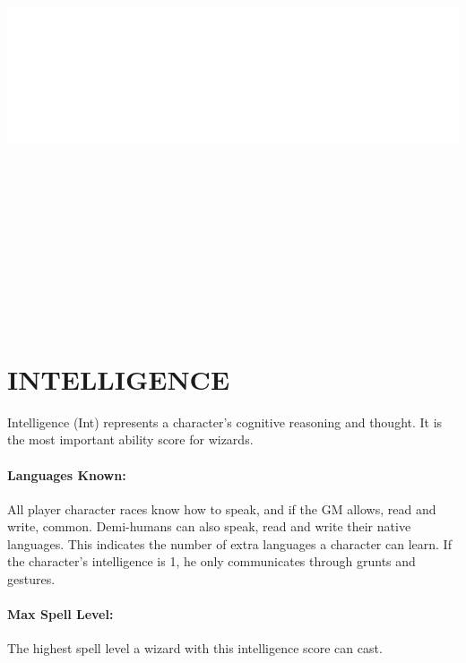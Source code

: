 \begin{multicols}{2}

\noindent\includegraphics[width=\columnwidth, height=5.75in]{testblock.pdf}  

\section{INTELLIGENCE}

Intelligence (Int) represents a character's cognitive reasoning and thought.  It is the most important ability score for wizards. 

\paragraph{Languages Known:}  All player character races know how to speak, and if the GM allows, read and write, common.  Demi-humans can also speak, read and write their native languages.  This indicates the number of extra languages a character can learn.  If the character's intelligence is 1, he only communicates through grunts and gestures.  

\paragraph{Max Spell Level:}  The highest spell level a wizard with this intelligence score can cast.


\end{multicols}
